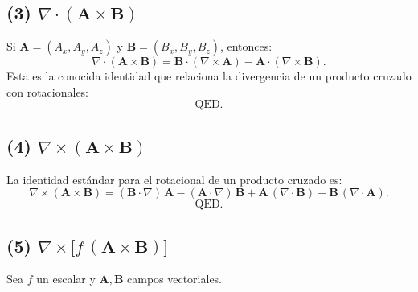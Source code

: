 \documentclass[12pt]{article}
\begin{document}
\subsection*{(3) $\nabla \cdot (\mathbf{A} \times \mathbf{B})$}
Si $\mathbf{A} = (A_x,A_y,A_z)$ y $\mathbf{B} = (B_x,B_y,B_z)$, entonces:
\[
\nabla \cdot (\mathbf{A} \times \mathbf{B})
= \mathbf{B}\cdot(\nabla \times \mathbf{A})
- \mathbf{A}\cdot(\nabla \times \mathbf{B}).
\]
Esta es la conocida identidad que relaciona la divergencia de un producto cruzado con rotacionales:
\[
\text{QED.}
\]

\subsection*{(4) $\nabla \times (\mathbf{A} \times \mathbf{B})$}
La identidad estándar para el rotacional de un producto cruzado es:
\[
\nabla \times (\mathbf{A} \times \mathbf{B})
= (\mathbf{B} \cdot \nabla)\,\mathbf{A}
- (\mathbf{A} \cdot \nabla)\,\mathbf{B}
+ \mathbf{A}\,(\nabla \cdot \mathbf{B})
- \mathbf{B}\,(\nabla \cdot \mathbf{A}).
\]
\[
\text{QED.}
\]

\subsection*{(5) $\nabla \times \bigl[f\,(\mathbf{A} \times \mathbf{B})\bigr]$}
Sea $f$ un escalar y $\mathbf{A}, \mathbf{B}$ campos vectoriales.
\end{document}
